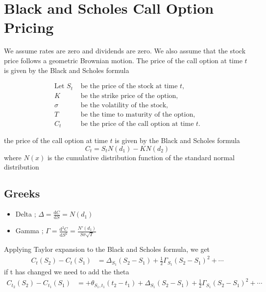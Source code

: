 \documentclass[12pt]{article}
\newcommand{\der}[2]{\frac{\mathrm{d}{#1}}{\mathrm{d}{#2}}}
\begin{document}
\section{Black and Scholes Call Option Pricing}
We assume rates are zero and dividends are zero. We also assume that the stock price follows a geometric Brownian motion. The price of the call option at time $t$ is given by the Black and Scholes formula
\begin{fleqn}
\begin{equation}
\begin{aligned}
\text{Let } S_t &\text{ be the price of the stock at time } t,\\
K &\text{ be the strike price of the option,}\\
\sigma &\text{ be the volatility of the stock,}\\
T &\text{ be the time to maturity of the option,}\\
C_t &\text{ be the price of the call option at time } t.
\end{aligned}
\end{equation}
\end{fleqn}
the price of the call option at time $t$ is given by the Black and Scholes formula
\[\boxed{C_t = S_tN(d_1) - KN(d_2)}\]
where $N(x)$ is the cumulative distribution function of the standard normal distribution
\subsection{Greeks}
\begin{itemize}
\item Delta ; $\Delta = \der{C}{S}=N(d_1)$
\item Gamma ; $\Gamma = \der{^2C}{S^2}=\frac{N'(d_1)}{S\sigma\sqrt{T}}$
\end{itemize}
Applying Taylor expansion to the Black and Scholes formula, we get
\begin{equation}
\begin{aligned}
C_t(S_2) -C_t(S_1) &= \Delta_{S_1}(S_2-S_1) + \frac{1}{2}\Gamma_{S_1}(S_2-S_1)^2 + \cdots
\end{aligned}
\end{equation}
if t has changed we need to add the theta
\begin{equation}
\begin{aligned}
C_{t_2}(S_2) -C_{t_1}(S_1) &= + \theta_{S_1,t_1}(t_2-t_1) +\Delta_{S_1}(S_2-S_1) + \frac{1}{2}\Gamma_{S_1}(S_2-S_1)^2 + \cdots
\end{aligned}
\end{equation}
\end{document}
